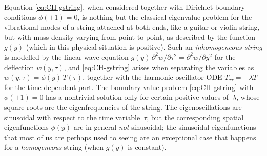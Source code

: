 \documentclass[10pt,a4paper]{article} \pdfoutput=1 
\begin{document}
Equation \eqref{eq:CH-gstring}, when considered together with Dirichlet
boundary conditions $\phi(\pm 1)=0$,
is nothing but the classical eigenvalue problem for the vibrational modes of
a string attached at both ends,
like a guitar or violin string,
but with mass density varying from point to point, as described by the function $g(y)$
(which in this physical situation is positive).
Such an \emph{inhomogeneous string} is modelled by the linear wave equation
$g(y) \, \partial^2 w / \partial \tau^2 = \partial^2 w / \partial y^2$
for the deflection $w(y,\tau)$,
and \eqref{eq:CH-gstring} arises when separating the variables as $w(y,\tau) = \phi(y) \, T(\tau)$,
together with the harmonic oscillator ODE $T_{\tau\tau} = -\lambda T$ for the time-dependent part.
The boundary value problem \eqref{eq:CH-gstring} with $\phi(\pm 1)=0$
has a nontrivial solution only for certain positive values of~$\lambda$,
whose square roots are the eigenfrequencies of the string.
The eigen\-oscillations are sinusoidal with respect to the time variable~$\tau$,
but the corresponding spatial eigenfunctions $\phi(y)$ are in general \emph{not} sinusoidal;
the sinusoidal eigenfunctions that most of us are perhaps used to seeing are
an exceptional case that happens for a \emph{homogeneous} string (when $g(y)$ is constant).
\end{document}
